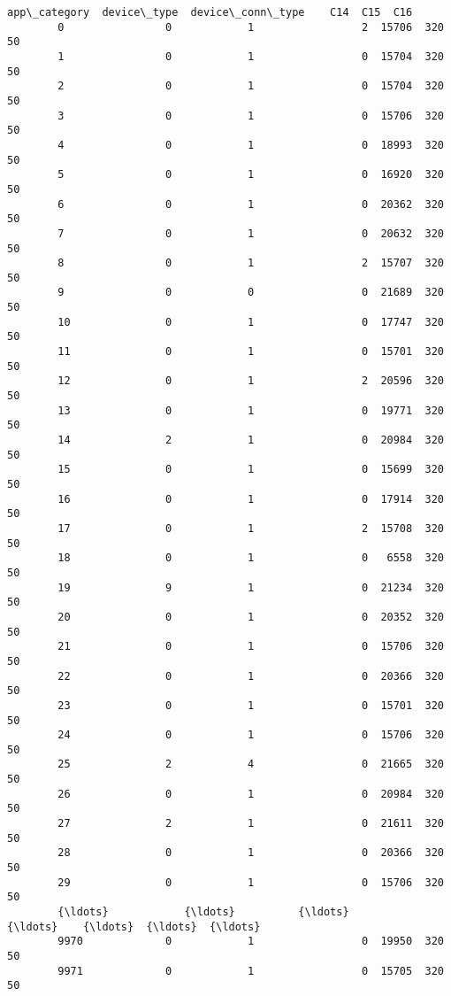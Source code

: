 \documentclass[11pt]{article}
\begin{document}
\begin{Verbatim}[commandchars=\\\{\}]
              app\_category  device\_type  device\_conn\_type    C14  C15  C16  
        0                0            1                 2  15706  320   50  
        1                0            1                 0  15704  320   50  
        2                0            1                 0  15704  320   50  
        3                0            1                 0  15706  320   50  
        4                0            1                 0  18993  320   50  
        5                0            1                 0  16920  320   50  
        6                0            1                 0  20362  320   50  
        7                0            1                 0  20632  320   50  
        8                0            1                 2  15707  320   50  
        9                0            0                 0  21689  320   50  
        10               0            1                 0  17747  320   50  
        11               0            1                 0  15701  320   50  
        12               0            1                 2  20596  320   50  
        13               0            1                 0  19771  320   50  
        14               2            1                 0  20984  320   50  
        15               0            1                 0  15699  320   50  
        16               0            1                 0  17914  320   50  
        17               0            1                 2  15708  320   50  
        18               0            1                 0   6558  320   50  
        19               9            1                 0  21234  320   50  
        20               0            1                 0  20352  320   50  
        21               0            1                 0  15706  320   50  
        22               0            1                 0  20366  320   50  
        23               0            1                 0  15701  320   50  
        24               0            1                 0  15706  320   50  
        25               2            4                 0  21665  320   50  
        26               0            1                 0  20984  320   50  
        27               2            1                 0  21611  320   50  
        28               0            1                 0  20366  320   50  
        29               0            1                 0  15706  320   50  
        {\ldots}            {\ldots}          {\ldots}               {\ldots}    {\ldots}  {\ldots}  {\ldots}  
        9970             0            1                 0  19950  320   50  
        9971             0            1                 0  15705  320   50  

\end{Verbatim}
\end{document}
